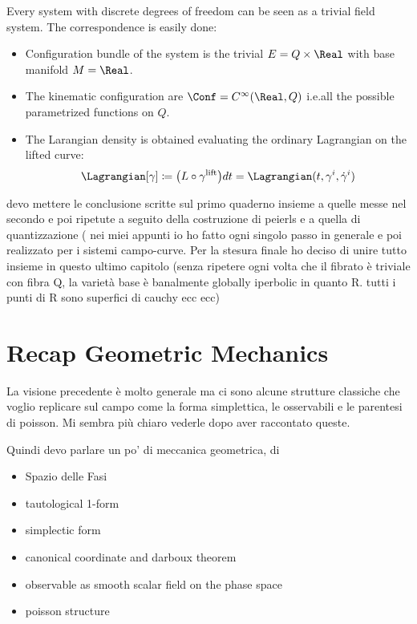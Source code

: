 \documentclass[Main]{subfiles}
\begin{document}
		  	Every system with discrete degrees of freedom can be seen as a trivial field system.
			The correspondence is easily done:
			\begin{itemize}
				\item Configuration bundle of the system is the trivial $E= Q \times \Real$ with base manifold $M=\Real$.
				\item The kinematic configuration are $\Conf=C^\infty(\Real,Q)$ i.e.all the possible parametrized functions on $Q$.
				\item The Larangian density is obtained evaluating the ordinary Lagrangian on the lifted curve:
					\begin{equation}
						\Lagrangian  [\gamma] \coloneqq \big( L \circ	\gamma^\textrm{lift} \big) dt  = \Lagrangian(t,\gamma^i,\dot{\gamma}^i)
					\end{equation}
	\end{itemize}
	\begin{Warning}
		devo mettere le conclusione scritte sul primo quaderno insieme a quelle messe nel secondo e poi ripetute a seguito della costruzione di peierls e a quella di quantizzazione ( nei miei appunti io ho fatto ogni singolo passo in generale e poi realizzato per i sistemi campo-curve. Per la stesura finale ho deciso di unire tutto insieme in questo ultimo capitolo (senza ripetere ogni volta che il fibrato è triviale con fibra Q, la varietà base è banalmente globally iperbolic in quanto R. tutti i punti di R sono superfici di cauchy ecc ecc)
	\end{Warning}
	
	\section{Recap Geometric Mechanics}
		
	\begin{Warning}	
	 La visione precedente è molto generale ma ci sono alcune strutture classiche che voglio replicare sul campo come la forma simplettica, le osservabili e le parentesi di poisson.
	 Mi sembra più chiaro vederle dopo aver raccontato queste.
	 
	Quindi devo parlare un po' di meccanica geometrica, di
	\begin{itemize}
		\item Spazio delle Fasi
		\item tautological 1-form
		\item simplectic form
		\item canonical coordinate and darboux theorem
		\item observable as smooth scalar field on the phase space
		\item poisson structure
	\end{itemize}
	\end{Warning}
	
\end{document}
